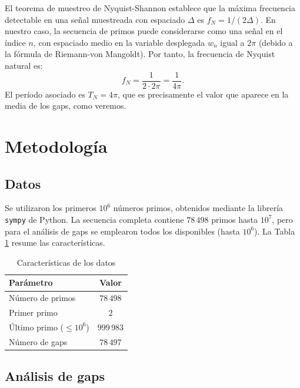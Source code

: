 \documentclass[12pt,a4paper]{article}
\theoremstyle{plain}
\theoremstyle{definition}
\theoremstyle{remark}
\begin{document}
El teorema de muestreo de Nyquist-Shannon establece que la máxima frecuencia detectable en una señal muestreada con espaciado $\Delta$ es $f_N = 1/(2\Delta)$. En nuestro caso, la secuencia de primos puede considerarse como una señal en el índice $n$, con espaciado medio en la variable desplegada $w_n$ igual a $2\pi$ (debido a la fórmula de Riemann-von Mangoldt). Por tanto, la frecuencia de Nyquist natural es:
\begin{equation}
f_N = \frac{1}{2\cdot 2\pi} = \frac{1}{4\pi}.
\end{equation}
El período asociado es $T_N = 4\pi$, que es precisamente el valor que aparece en la media de los gaps, como veremos.

\section{Metodología}

\subsection{Datos}

Se utilizaron los primeros $10^6$ números primos, obtenidos mediante la librería \texttt{sympy} de Python. La secuencia completa contiene $78\,498$ primos hasta $10^7$, pero para el análisis de gaps se emplearon todos los disponibles (hasta $10^6$). La Tabla \ref{tab:datos} resume las características.

\begin{table}[h]
\centering
\caption{Características de los datos}
\label{tab:datos}
\begin{tabular}{lc}
\toprule
\textbf{Parámetro} & \textbf{Valor} \\
\midrule
Número de primos & $78\,498$ \\
Primer primo & $2$ \\
Último primo ($\leq 10^6$) & $999\,983$ \\
Número de gaps & $78\,497$ \\
\bottomrule
\end{tabular}
\end{table}

\subsection{Análisis de gaps}
\end{document}
